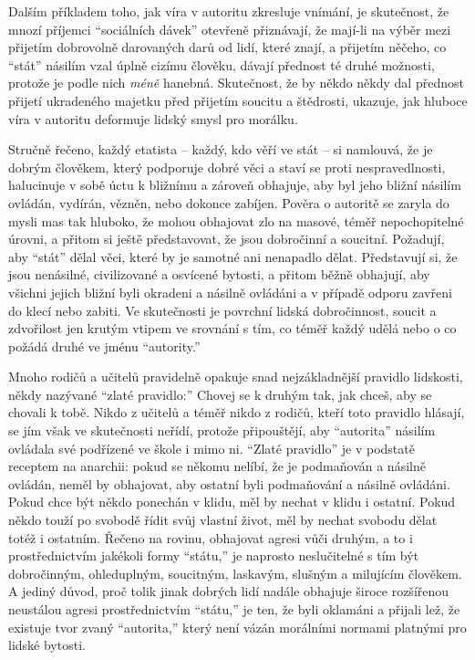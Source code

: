 \documentclass{book}
\begin{document}
Dalším příkladem toho, jak víra v autoritu zkresluje vnímání, je skutečnost, že mnozí příjemci \enquote{sociálních dávek} otevřeně přiznávají, že mají-li na výběr mezi přijetím dobrovolně darovaných darů od lidí, které znají, a přijetím něčeho, co \enquote{stát} násilím vzal úplně cizímu člověku, dávají přednost té druhé možnosti, protože je podle nich \emph{méně} hanebná. Skutečnost, že by někdo někdy dal přednost přijetí ukradeného majetku před přijetím soucitu a štědrosti, ukazuje, jak hluboce víra v autoritu deformuje lidský smysl pro morálku.

Stručně řečeno, každý etatista -- každý, kdo věří ve stát -- si namlouvá, že je dobrým člověkem, který podporuje dobré věci a staví se proti nespravedlnosti, halucinuje v sobě úctu k bližnímu a zároveň obhajuje, aby byl jeho bližní násilím ovládán, vydírán, vězněn, nebo dokonce zabíjen. Pověra o autoritě se zaryla do mysli mas tak hluboko, že mohou obhajovat zlo na masové, téměř nepochopitelné úrovni, a přitom si ještě představovat, že jsou dobročinní a soucitní. Požadují, aby \enquote{stát} dělal věci, které by je samotné ani nenapadlo dělat. Představují si, že jsou nenásilné, civilizované a osvícené bytosti, a přitom běžně obhajují, aby všichni jejich bližní byli okradeni a násilně ovládáni a v případě odporu zavřeni do klecí nebo zabiti. Ve skutečnosti je povrchní lidská dobročinnost, soucit a zdvořilost jen krutým vtipem ve srovnání s tím, co téměř každý udělá nebo o co požádá druhé ve jménu \enquote{autority.}

Mnoho rodičů a učitelů pravidelně opakuje snad nejzákladnější pravidlo lidskosti, někdy nazývané \enquote{zlaté pravidlo:} Chovej se k druhým tak, jak chceš, aby se chovali k tobě. Nikdo z učitelů a téměř nikdo z rodičů, kteří toto pravidlo hlásají, se jím však ve skutečnosti neřídí, protože připouštějí, aby \enquote{autorita} násilím ovládala své podřízené ve škole i mimo ni. \enquote{Zlaté pravidlo} je v podstatě receptem na anarchii: pokud se někomu nelíbí, že je podmaňován a násilně ovládán, neměl by obhajovat, aby ostatní byli podmaňování a násilně ovládáni. Pokud chce být někdo ponechán v klidu, měl by nechat v klidu i ostatní. Pokud někdo touží po svobodě řídit svůj vlastní život, měl by nechat svobodu dělat totéž i ostatním. Řečeno na rovinu, obhajovat agresi vůči druhým, a to i prostřednictvím jakékoli formy \enquote{státu,} je naprosto neslučitelné s tím být dobročinným, ohleduplným, soucitným, laskavým, slušným a milujícím člověkem. A jediný důvod, proč tolik jinak dobrých lidí nadále obhajuje široce rozšířenou neustálou agresi prostřednictvím \enquote{státu,} je ten, že byli oklamáni a přijali lež, že existuje tvor zvaný \enquote{autorita,} který není vázán morálními normami platnými pro lidské bytosti.
\end{document}
